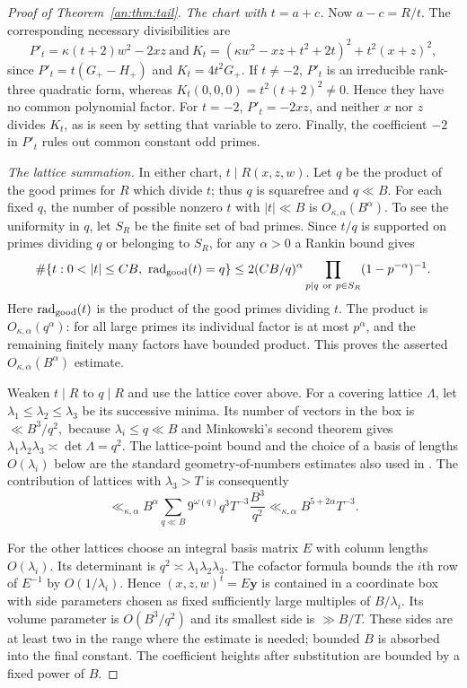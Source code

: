 \documentclass[11pt,reqno]{amsart}
\theoremstyle{definition}
\numberwithin{equation}{section}
\def\t{\text}
\begin{document}
\begin{proof}[Proof of Theorem~\ref{an:thm:tail}]
\smallskip\noindent
\emph{The chart with $t=a+c$.}
Now $a-c=R/t$. The corresponding necessary divisibilities are
\begin{equation}\label{an:eq:charttwo}
 P'_t=\kappa(t+2)w^2-2xz\ \t{and}\ 
 K_t=(\kappa w^2-xz+t^2+2t)^2+t^2(x+z)^2,
\end{equation}
since $P'_t=t(G_+-H_+)$ and $K_t=4t^2G_+$. If $t\ne-2$, $P'_t$ is an irreducible rank-three quadratic form, whereas $K_t(0,0,0)=t^2(t+2)^2\ne0$. Hence they have no common polynomial factor. For $t=-2$, $P'_t=-2xz$, and neither $x$ nor $z$ divides $K_t$, as is seen by setting that variable to zero. Finally, the coefficient $-2$ in $P'_t$ rules out common constant odd primes.

\smallskip\noindent
\emph{The lattice summation.}
In either chart, $t\mid R(x,z,w)$. Let $q$ be the product of the good primes for $R$ which divide $t$; thus $q$ is squarefree and $q\ll B$. For each fixed $q$, the number of possible nonzero $t$ with $|t|\ll B$ is $O_{\kappa,\alpha}(B^\alpha)$. To see the uniformity in $q$, let $S_R$ be the finite set of bad primes. Since $t/q$ is supported on primes dividing $q$ or belonging to $S_R$, for any $\alpha>0$ a Rankin bound gives
\[
 \#\{t:0<|t|\le CB,\ \operatorname{rad}_{\rm good}(t)=q\}
 \le 2(CB/q)^\alpha
       \prod_{p\mid q\ {\rm or}\ p\in S_R}(1-p^{-\alpha})^{-1}.
\]
Here $\operatorname{rad}_{\rm good}(t)$ is the product of the good primes dividing $t$. The product is $O_{\kappa,\alpha}(q^\alpha)$: for all large primes its individual factor is at most $p^\alpha$, and the remaining finitely many factors have bounded product. This proves the asserted $O_{\kappa,\alpha}(B^\alpha)$ estimate.

Weaken $t\mid R$ to $q\mid R$ and use the lattice cover above. For a covering lattice $\Lambda$, let $\lambda_1\le\lambda_2\le\lambda_3$ be its successive minima. Its number of vectors in the box is
$ \ll B^3/q^2,$
because $\lambda_i\le q\ll B$ and Minkowski's second theorem gives $\lambda_1\lambda_2\lambda_3\asymp\det\Lambda=q^2$. The lattice-point bound and the choice of a basis of lengths $O(\lambda_i)$ below are the standard geometry-of-numbers estimates also used in \cite[Section 4]{BHB}. The contribution of lattices with $\lambda_3>T$ is consequently
\begin{equation}\label{an:eq:largemin}
 \ll_{\kappa,\alpha}
 B^\alpha\sum_{q\ll B}9^{\omega(q)}q^3T^{-3}\frac{B^3}{q^2}
 \ll_{\kappa,\alpha} B^{5+2\alpha}T^{-3}.
\end{equation}

For the other lattices choose an integral basis matrix $E$ with column lengths $O(\lambda_i)$. Its determinant is $q^2\asymp\lambda_1\lambda_2\lambda_3$. The cofactor formula bounds the $i$th row of $E^{-1}$ by $O(1/\lambda_i)$. Hence $(x,z,w)^t=E\mathbf y$ is contained in a coordinate box with side parameters chosen as fixed sufficiently large multiples of $B/\lambda_i$. Its volume parameter is $O(B^3/q^2)$ and its smallest side is $\gg B/T$. These sides are at least two in the range where the estimate is needed; bounded $B$ is absorbed into the final constant. The coefficient heights after substitution are bounded by a fixed power of $B$.


\end{proof}
\end{document}
